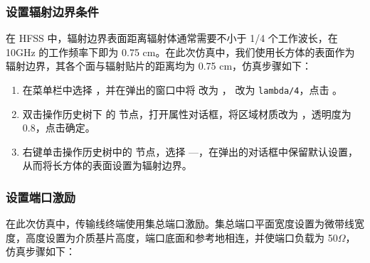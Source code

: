 \documentclass[12pt,a4paper,UTF8]{article}
\begin{document}
\subsubsection{设置辐射边界条件}

在 HFSS 中，辐射边界表面距离辐射体通常需要不小于 1/4 个工作波长，在 10GHz 的工作频率下即为 0.75 cm。在此次仿真中，我们使用长方体的表面作为辐射边界，其各个面与辐射贴片的距离均为 0.75 cm，仿真步骤如下：

\begin{enumerate}
    \item 在菜单栏中选择 ，并在弹出的窗口中将  改为 ， 改为 \texttt{lambda/4}，点击 。
    
    \item 双击操作历史树下  的  节点，打开属性对话框，将区域材质改为 ，透明度为 0.8，点击确定。
    
    \item 右键单击操作历史树中的  节点，选择 —，在弹出的对话框中保留默认设置，从而将长方体的表面设置为辐射边界。
\end{enumerate}

\subsubsection{设置端口激励}

在此次仿真中，传输线终端使用集总端口激励。集总端口平面宽度设置为微带线宽度，高度设置为介质基片高度，端口底面和参考地相连，并使端口负载为 50$\Omega$，仿真步骤如下：
\end{document}
